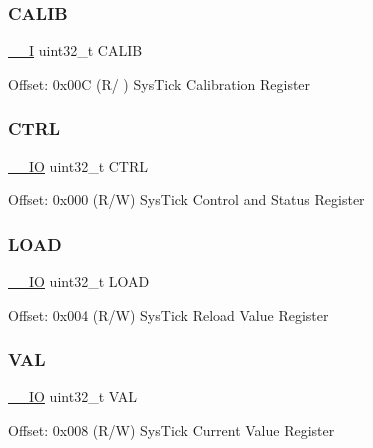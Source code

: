 \subsubsection{\texorpdfstring{CALIB}{CALIB}}
{\footnotesize\ttfamily \mbox{\hyperlink{core__sc300_8h_af63697ed9952cc71e1225efe205f6cd3}{\+\_\+\+\_\+I}} uint32\+\_\+t C\+A\+L\+IB}

Offset\+: 0x00C (R/ ) Sys\+Tick Calibration Register \mbox{\label{struct_sys_tick___type_a15fc8d35f045f329b80c544bef35ff64}} 
\subsubsection{\texorpdfstring{CTRL}{CTRL}}
{\footnotesize\ttfamily \mbox{\hyperlink{core__sc300_8h_aec43007d9998a0a0e01faede4133d6be}{\+\_\+\+\_\+\+IO}} uint32\+\_\+t C\+T\+RL}

Offset\+: 0x000 (R/W) Sys\+Tick Control and Status Register \mbox{\label{struct_sys_tick___type_aad9adf4efc940cddb8161b69cfbe19d3}} 
\subsubsection{\texorpdfstring{LOAD}{LOAD}}
{\footnotesize\ttfamily \mbox{\hyperlink{core__sc300_8h_aec43007d9998a0a0e01faede4133d6be}{\+\_\+\+\_\+\+IO}} uint32\+\_\+t L\+O\+AD}

Offset\+: 0x004 (R/W) Sys\+Tick Reload Value Register \mbox{\label{struct_sys_tick___type_a26fb318c3b0a0ec7f45daafd5f8799a3}} 
\subsubsection{\texorpdfstring{VAL}{VAL}}
{\footnotesize\ttfamily \mbox{\hyperlink{core__sc300_8h_aec43007d9998a0a0e01faede4133d6be}{\+\_\+\+\_\+\+IO}} uint32\+\_\+t V\+AL}

Offset\+: 0x008 (R/W) Sys\+Tick Current Value Register 

